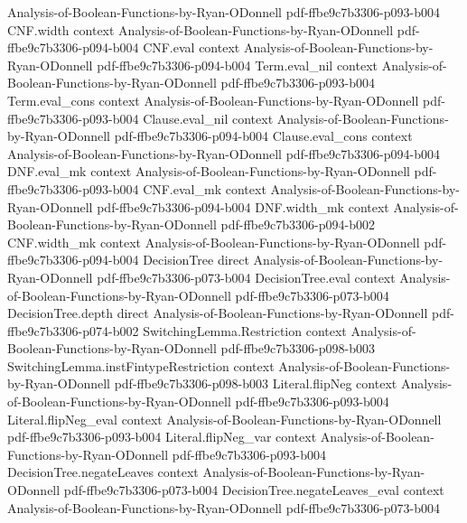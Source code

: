 \begin{lemma}
  {Analysis-of-Boolean-Functions-by-Ryan-ODonnell}
  {pdf-ffbe9c7b3306-p093-b004}
\proofstep
  {CNF.width}
  {context}
  {Analysis-of-Boolean-Functions-by-Ryan-ODonnell}
  {pdf-ffbe9c7b3306-p094-b004}
\proofstep
  {CNF.eval}
  {context}
  {Analysis-of-Boolean-Functions-by-Ryan-ODonnell}
  {pdf-ffbe9c7b3306-p094-b004}
\proofstep
  {Term.eval_nil}
  {context}
  {Analysis-of-Boolean-Functions-by-Ryan-ODonnell}
  {pdf-ffbe9c7b3306-p093-b004}
\proofstep
  {Term.eval_cons}
  {context}
  {Analysis-of-Boolean-Functions-by-Ryan-ODonnell}
  {pdf-ffbe9c7b3306-p093-b004}
\proofstep
  {Clause.eval_nil}
  {context}
  {Analysis-of-Boolean-Functions-by-Ryan-ODonnell}
  {pdf-ffbe9c7b3306-p094-b004}
\proofstep
  {Clause.eval_cons}
  {context}
  {Analysis-of-Boolean-Functions-by-Ryan-ODonnell}
  {pdf-ffbe9c7b3306-p094-b004}
\proofstep
  {DNF.eval_mk}
  {context}
  {Analysis-of-Boolean-Functions-by-Ryan-ODonnell}
  {pdf-ffbe9c7b3306-p093-b004}
\proofstep
  {CNF.eval_mk}
  {context}
  {Analysis-of-Boolean-Functions-by-Ryan-ODonnell}
  {pdf-ffbe9c7b3306-p094-b004}
\proofstep
  {DNF.width_mk}
  {context}
  {Analysis-of-Boolean-Functions-by-Ryan-ODonnell}
  {pdf-ffbe9c7b3306-p094-b002}
\proofstep
  {CNF.width_mk}
  {context}
  {Analysis-of-Boolean-Functions-by-Ryan-ODonnell}
  {pdf-ffbe9c7b3306-p094-b004}
\proofstep
  {DecisionTree}
  {direct}
  {Analysis-of-Boolean-Functions-by-Ryan-ODonnell}
  {pdf-ffbe9c7b3306-p073-b004}
\proofstep
  {DecisionTree.eval}
  {context}
  {Analysis-of-Boolean-Functions-by-Ryan-ODonnell}
  {pdf-ffbe9c7b3306-p073-b004}
\proofstep
  {DecisionTree.depth}
  {direct}
  {Analysis-of-Boolean-Functions-by-Ryan-ODonnell}
  {pdf-ffbe9c7b3306-p074-b002}
\proofstep
  {SwitchingLemma.Restriction}
  {context}
  {Analysis-of-Boolean-Functions-by-Ryan-ODonnell}
  {pdf-ffbe9c7b3306-p098-b003}
\proofstep
  {SwitchingLemma.instFintypeRestriction}
  {context}
  {Analysis-of-Boolean-Functions-by-Ryan-ODonnell}
  {pdf-ffbe9c7b3306-p098-b003}
\proofstep
  {Literal.flipNeg}
  {context}
  {Analysis-of-Boolean-Functions-by-Ryan-ODonnell}
  {pdf-ffbe9c7b3306-p093-b004}
\proofstep
  {Literal.flipNeg_eval}
  {context}
  {Analysis-of-Boolean-Functions-by-Ryan-ODonnell}
  {pdf-ffbe9c7b3306-p093-b004}
\proofstep
  {Literal.flipNeg_var}
  {context}
  {Analysis-of-Boolean-Functions-by-Ryan-ODonnell}
  {pdf-ffbe9c7b3306-p093-b004}
\proofstep
  {DecisionTree.negateLeaves}
  {context}
  {Analysis-of-Boolean-Functions-by-Ryan-ODonnell}
  {pdf-ffbe9c7b3306-p073-b004}
\proofstep
  {DecisionTree.negateLeaves_eval}
  {context}
  {Analysis-of-Boolean-Functions-by-Ryan-ODonnell}
  {pdf-ffbe9c7b3306-p073-b004}

\end{lemma}
